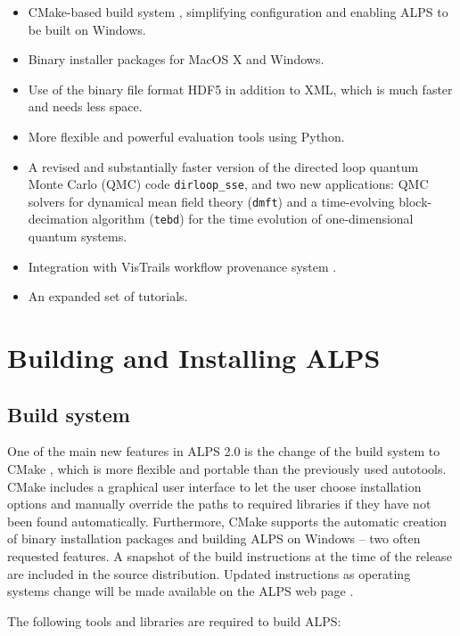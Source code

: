 \documentclass[12pt]{iopart}
\begin{document}
 \begin{itemize}
\item CMake-based build system \cite{cmake}, simplifying configuration and enabling ALPS to be built on  Windows.
\item Binary installer packages for MacOS X and Windows.
\item Use of the binary file format HDF5 \cite{hdf5} in addition to XML, which is much faster and needs less space.
\item More flexible and powerful evaluation tools using Python.
\item A revised and substantially faster version of the directed loop quantum Monte Carlo (QMC) code {\tt dirloop\_sse}, and two new applications: QMC solvers for dynamical 
mean field theory ({\tt dmft}) and a time-evolving block-decimation algorithm ({\tt tebd}) for the time evolution of one-dimensional quantum systems.
\item Integration with VisTrails workflow provenance system \cite{vistrails}.
\item An expanded set of tutorials.
 \end{itemize}
 
 
\section{Building and Installing ALPS}
\subsection{Build system}
One of the main new features in ALPS 2.0 is the change of the build system to CMake \cite{cmake}, which is more flexible and portable than the previously used autotools. CMake includes a graphical user interface to let the user choose installation options and manually override the paths to required libraries if they have not been found automatically. Furthermore,  CMake supports the automatic creation of binary installation packages and building ALPS on Windows -- two often requested features. A snapshot of the build instructions at the time of the release are included in the source distribution. Updated instructions as operating systems change will be made available on the ALPS web page \cite{alps}.

The following tools and libraries are required to build ALPS:
\end{document}
